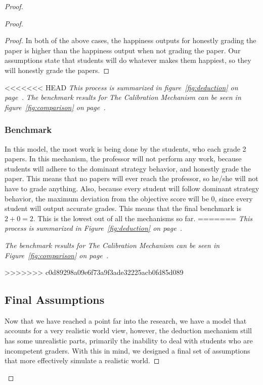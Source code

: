 \documentclass[12pt, Arial]{article}
\begin{document}
\begin{proof}
\begin{proof}
\begin{proof}
In both of the above cases, the happiness outputs for honestly grading the paper is higher than the happiness output when not grading the paper. Our assumptions state that students will do whatever makes them happiest, so they will honestly grade the papers.

\end{proof}
<<<<<<< HEAD
\noindent
\emph{This process is summarized in figure~\ref{fig:deduction} on page~\pageref{fig:deduction}.}
\newline
\emph{The benchmark results for The Calibration Mechanism can be seen in figure~\ref{fig:comparison} on page~\pageref{fig:comparison}.}
\subsubsection{Benchmark}
In this model, the most work is being done by the students, who each grade 2 papers. In this mechanism, the professor will not perform any work, because students will adhere to the dominant strategy behavior, and honestly grade the paper. This means that no papers will ever reach the professor, so he/she will not have to grade anything. Also, because every student will follow dominant strategy behavior, the maximum deviation from the objective score will be 0, since every student will output accurate grades. This means that the final benchmark is $2+0=2$. This is the lowest out of all the mechanisms so far.
=======
\emph{This process is summarized in Figure~\ref{fig:deduction} on page~\pageref{fig:deduction}.}

\emph{The benchmark results for The Calibration Mechanism can be seen in Figure~\ref{fig:comparison} on page~\pageref{fig:comparison}.}

>>>>>>> c0d89298a09e6f73a9f3ade32225acb0fd85d089
\subsection{Final Assumptions}
Now that we have reached a point far into the research, we have a model that accounts for a very realistic world view, however, the deduction mechanism still has some unrealistic parts, primarily the inability to deal with students who are incompetent graders. With this in mind, we designed a final set of assumptions that more effectively simulate a realistic world.


\end{proof}
\end{proof}
\end{document}
